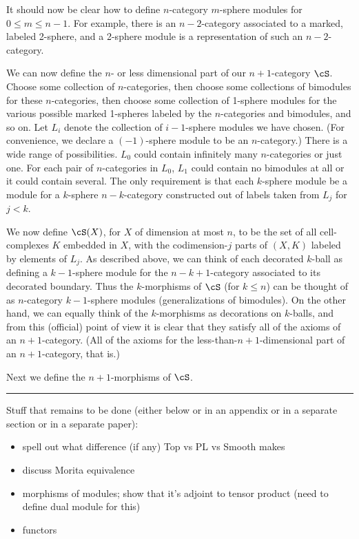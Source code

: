 \medskip

It should now be clear how to define $n$-category $m$-sphere modules for $0\le m \le n-1$.
For example, there is an $n{-}2$-category associated to a marked, labeled 2-sphere,
and a 2-sphere module is a representation of such an $n{-}2$-category.

\medskip

We can now define the $n$- or less dimensional part of our $n{+}1$-category $\cS$.
Choose some collection of $n$-categories, then choose some collections of bimodules for
these $n$-categories, then choose some collection of 1-sphere modules for the various
possible marked 1-spheres labeled by the $n$-categories and bimodules, and so on.
Let $L_i$ denote the collection of $i{-}1$-sphere modules we have chosen.
(For convenience, we declare a $(-1)$-sphere module to be an $n$-category.)
There is a wide range of possibilities.
$L_0$ could contain infinitely many $n$-categories or just one.
For each pair of $n$-categories in $L_0$, $L_1$ could contain no bimodules at all or 
it could contain several.
The only requirement is that each $k$-sphere module be a module for a $k$-sphere $n{-}k$-category
constructed out of labels taken from $L_j$ for $j<k$.

We now define $\cS(X)$, for $X$ of dimension at most $n$, to be the set of all 
cell-complexes $K$ embedded in $X$, with the codimension-$j$ parts of $(X, K)$ labeled
by elements of $L_j$.
As described above, we can think of each decorated $k$-ball as defining a $k{-}1$-sphere module
for the $n{-}k{+}1$-category associated to its decorated boundary.
Thus the $k$-morphisms of $\cS$ (for $k\le n$) can be thought 
of as $n$-category $k{-}1$-sphere modules 
(generalizations of bimodules).
On the other hand, we can equally think of the $k$-morphisms as decorations on $k$-balls, 
and from this (official) point of view it is clear that they satisfy all of the axioms of an
$n{+}1$-category.
(All of the axioms for the less-than-$n{+}1$-dimensional part of an $n{+}1$-category, that is.)

\medskip

Next we define the $n{+}1$-morphisms of $\cS$.








\medskip
\hrule
\medskip

\medskip






Stuff that remains to be done (either below or in an appendix or in a separate section or in
a separate paper):
\begin{itemize}
\item spell out what difference (if any) Top vs PL vs Smooth makes
\item discuss Morita equivalence
\item morphisms of modules; show that it's adjoint to tensor product
(need to define dual module for this)
\item functors
\end{itemize}


